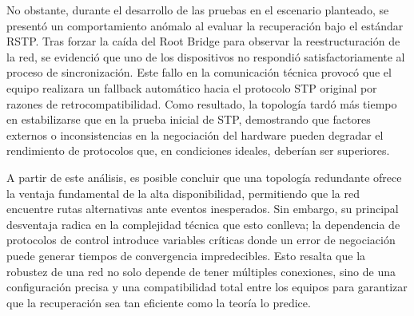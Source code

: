 No obstante, durante el desarrollo de las pruebas en el escenario planteado, se
presentó un comportamiento anómalo al evaluar la recuperación bajo el estándar RSTP.
Tras forzar la caída del Root Bridge para observar la reestructuración de la red, se
evidenció que uno de los dispositivos no respondió satisfactoriamente al proceso de
sincronización. Este fallo en la comunicación técnica provocó que el equipo realizara
un fallback automático hacia el protocolo STP original por razones de
retrocompatibilidad. Como resultado, la topología tardó más tiempo en estabilizarse que
en la prueba inicial de STP, demostrando que factores externos o inconsistencias en la
negociación del hardware pueden degradar el rendimiento de protocolos que, en
condiciones ideales, deberían ser superiores.


A partir de este análisis, es posible concluir que una topología redundante ofrece la
ventaja fundamental de la alta disponibilidad, permitiendo que la red encuentre rutas
alternativas ante eventos inesperados. Sin embargo, su principal desventaja radica en
la complejidad técnica que esto conlleva; la dependencia de protocolos de control
introduce variables críticas donde un error de negociación puede generar tiempos de
convergencia impredecibles. Esto resalta que la robustez de una red no solo depende de
tener múltiples conexiones, sino de una configuración precisa y una compatibilidad
total entre los equipos para garantizar que la recuperación sea tan eficiente como la
teoría lo predice.

